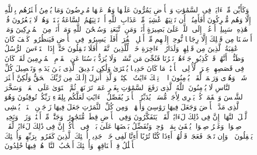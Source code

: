 \startbuffer[\q:12:105]
وَكَأَیِّن مِّنۡ ءَایَةࣲ فِی ٱلسَّمَٰوَٰتِ وَٱلۡأَرۡضِ یَمُرُّونَ عَلَیۡهَا وَهُمۡ عَنۡهَا مُعۡرِضُونَ%
\stopbuffer%
\startbuffer[\q:12:106]
وَمَا یُؤۡمِنُ أَكۡثَرُهُم بِٱللَّهِ إِلَّا وَهُم مُّشۡرِكُونَ%
\stopbuffer%
\startbuffer[\q:12:107]
أَفَأَمِنُوۤا۟ أَن تَأۡتِیَهُمۡ غَٰشِیَةࣱ مِّنۡ عَذَابِ ٱللَّهِ أَوۡ تَأۡتِیَهُمُ ٱلسَّاعَةُ بَغۡتَةࣰ وَهُمۡ لَا یَشۡعُرُونَ%
\stopbuffer%
\startbuffer[\q:12:108]
قُلۡ هَٰذِهِۦ سَبِیلِیۤ أَدۡعُوۤا۟ إِلَى ٱللَّهِۚ عَلَىٰ بَصِیرَةٍ أَنَا۠ وَمَنِ ٱتَّبَعَنِیۖ وَسُبۡحَٰنَ ٱللَّهِ وَمَاۤ أَنَا۠ مِنَ ٱلۡمُشۡرِكِینَ%
\stopbuffer%
\startbuffer[\q:12:109]
وَمَاۤ أَرۡسَلۡنَا مِن قَبۡلِكَ إِلَّا رِجَالࣰا نُّوحِیۤ إِلَیۡهِم مِّنۡ أَهۡلِ ٱلۡقُرَىٰۤۗ أَفَلَمۡ یَسِیرُوا۟ فِی ٱلۡأَرۡضِ فَیَنظُرُوا۟ كَیۡفَ كَانَ عَٰقِبَةُ ٱلَّذِینَ مِن قَبۡلِهِمۡۗ وَلَدَارُ ٱلۡءَاخِرَةِ خَیۡرࣱ لِّلَّذِینَ ٱتَّقَوۡا۟ۚ أَفَلَا تَعۡقِلُونَ%
\stopbuffer%
\startbuffer[\q:12:110]
حَتَّىٰۤ إِذَا ٱسۡتَیۡءَسَ ٱلرُّسُلُ وَظَنُّوۤا۟ أَنَّهُمۡ قَدۡ كُذِبُوا۟ جَاۤءَهُمۡ نَصۡرُنَا فَنُجِّیَ مَن نَّشَاۤءُۖ وَلَا یُرَدُّ بَأۡسُنَا عَنِ ٱلۡقَوۡمِ ٱلۡمُجۡرِمِینَ%
\stopbuffer%
\startbuffer[\q:12:111]
لَقَدۡ كَانَ فِی قَصَصِهِمۡ عِبۡرَةࣱ لِّأُو۟لِی ٱلۡأَلۡبَٰبِۗ مَا كَانَ حَدِیثࣰا یُفۡتَرَىٰ وَلَٰكِن تَصۡدِیقَ ٱلَّذِی بَیۡنَ یَدَیۡهِ وَتَفۡصِیلَ كُلِّ شَیۡءࣲ وَهُدࣰى وَرَحۡمَةࣰ لِّقَوۡمࣲ یُؤۡمِنُونَ%
\stopbuffer%
\startbuffer[\q:13:1]
الۤمۤرۚ تِلۡكَ ءَایَٰتُ ٱلۡكِتَٰبِۗ وَٱلَّذِیۤ أُنزِلَ إِلَیۡكَ مِن رَّبِّكَ ٱلۡحَقُّ وَلَٰكِنَّ أَكۡثَرَ ٱلنَّاسِ لَا یُؤۡمِنُونَ%
\stopbuffer%
\startbuffer[\q:13:2]
ٱللَّهُ ٱلَّذِی رَفَعَ ٱلسَّمَٰوَٰتِ بِغَیۡرِ عَمَدࣲ تَرَوۡنَهَاۖ ثُمَّ ٱسۡتَوَىٰ عَلَى ٱلۡعَرۡشِۖ وَسَخَّرَ ٱلشَّمۡسَ وَٱلۡقَمَرَۖ كُلࣱّ یَجۡرِی لِأَجَلࣲ مُّسَمࣰّىۚ یُدَبِّرُ ٱلۡأَمۡرَ یُفَصِّلُ ٱلۡءَایَٰتِ لَعَلَّكُم بِلِقَاۤءِ رَبِّكُمۡ تُوقِنُونَ%
\stopbuffer%
\startbuffer[\q:13:3]
وَهُوَ ٱلَّذِی مَدَّ ٱلۡأَرۡضَ وَجَعَلَ فِیهَا رَوَٰسِیَ وَأَنۡهَٰرࣰاۖ وَمِن كُلِّ ٱلثَّمَرَٰتِ جَعَلَ فِیهَا زَوۡجَیۡنِ ٱثۡنَیۡنِۖ یُغۡشِی ٱلَّیۡلَ ٱلنَّهَارَۚ إِنَّ فِی ذَٰلِكَ لَءَایَٰتࣲ لِّقَوۡمࣲ یَتَفَكَّرُونَ%
\stopbuffer%
\startbuffer[\q:13:4]
وَفِی ٱلۡأَرۡضِ قِطَعࣱ مُّتَجَٰوِرَٰتࣱ وَجَنَّٰتࣱ مِّنۡ أَعۡنَٰبࣲ وَزَرۡعࣱ وَنَخِیلࣱ صِنۡوَانࣱ وَغَیۡرُ صِنۡوَانࣲ یُسۡقَىٰ بِمَاۤءࣲ وَٰحِدࣲ وَنُفَضِّلُ بَعۡضَهَا عَلَىٰ بَعۡضࣲ فِی ٱلۡأُكُلِۚ إِنَّ فِی ذَٰلِكَ لَءَایَٰتࣲ لِّقَوۡمࣲ یَعۡقِلُونَ%
\stopbuffer%
\startbuffer[\q:13:5]
۞ وَإِن تَعۡجَبۡ فَعَجَبࣱ قَوۡلُهُمۡ أَءِذَا كُنَّا تُرَٰبًا أَءِنَّا لَفِی خَلۡقࣲ جَدِیدٍۗ أُو۟لَٰۤئِكَ ٱلَّذِینَ كَفَرُوا۟ بِرَبِّهِمۡۖ وَأُو۟لَٰۤئِكَ ٱلۡأَغۡلَٰلُ فِیۤ أَعۡنَاقِهِمۡۖ وَأُو۟لَٰۤئِكَ أَصۡحَٰبُ ٱلنَّارِۖ هُمۡ فِیهَا خَٰلِدُونَ%
\stopbuffer%
